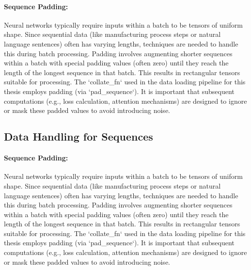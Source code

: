 \begin{appendices}
  \paragraph{Sequence Padding:}
  Neural networks typically require inputs within a batch to be tensors of uniform shape. Since sequential data (like manufacturing process steps or natural language sentences) often has varying lengths, techniques are needed to handle this during batch processing. Padding involves augmenting shorter sequences within a batch with special padding values (often zero) until they reach the length of the longest sequence in that batch. This results in rectangular tensors suitable for processing. The `collate_fn` used in the data loading pipeline for this thesis employs padding (via `pad_sequence`). It is important that subsequent computations (e.g., loss calculation, attention mechanisms) are designed to ignore or mask these padded values to avoid introducing noise.


  \subsection{Data Handling for Sequences}

  \paragraph{Sequence Padding:}
  Neural networks typically require inputs within a batch to be tensors of uniform shape. Since sequential data (like manufacturing process steps or natural language sentences) often has varying lengths, techniques are needed to handle this during batch processing. Padding involves augmenting shorter sequences within a batch with special padding values (often zero) until they reach the length of the longest sequence in that batch. This results in rectangular tensors suitable for processing. The `collate_fn` used in the data loading pipeline for this thesis employs padding (via `pad_sequence`). It is important that subsequent computations (e.g., loss calculation, attention mechanisms) are designed to ignore or mask these padded values to avoid introducing noise.


\end{appendices}
